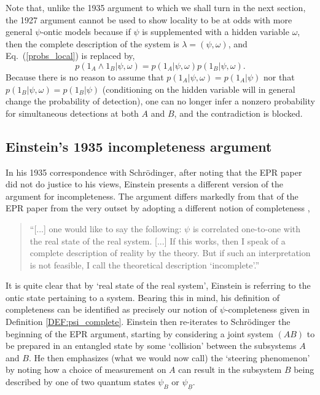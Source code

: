 \documentclass[aps,nofootinbib,12pt]{revtex4}
\begin{document}
Note that, unlike the 1935 argument to which we shall turn in the
next section, the 1927 argument cannot be used to show locality to
be at odds with more general $\psi$-ontic models because if $\psi$
is supplemented with a hidden variable $\omega$, then the complete
description of the system is $\lambda=(\psi,\omega)$, and
Eq.~(\ref{probs_local}) is replaced by,
\begin{equation}
p(1_{A}\wedge{1}_{B}|\psi,\omega)=p(1_{A}|\psi,\omega)p(1_{B}|\psi,\omega).
\end{equation}
Because there is no reason to assume that
$p(1_{A}|\psi,\omega)=p(1_{A}|\psi)$ nor that
$p(1_{B}|\psi,\omega)=p(1_{B}|\psi)$ (conditioning on the hidden
variable will in general change the probability of detection), one
can no longer infer a nonzero probability for simultaneous
detections at both $A$ and $B$, and the contradiction is blocked.

\subsection{Einstein's 1935 incompleteness argument\label{SEC:historical_1935}}

In his 1935 correspondence with Schr\"{o}dinger, after noting that
the EPR paper did not do justice to his views, Einstein presents a
different version of the argument for incompleteness. The argument
differs markedly from that of the EPR paper from the very outset by
adopting a different notion of completeness \cite{EtoS1935},

\begin{quote}
``[...] one would like to say the following: $\psi$ is correlated
one-to-one with the real state of the real system. [...] If this
works, then I speak of a complete description of reality by the
theory. But if such an interpretation is not feasible, I call the
theoretical description `incomplete'.''
\end{quote}

It is quite clear that by `real state of the real system', Einstein
is referring to the ontic state pertaining to a system. Bearing this
in mind, his definition of completeness can be identified as
precisely our notion of $\psi $-completeness given in Definition
\ref{DEF:psi_complete}. Einstein then re-iterates to Schr\"{o}dinger
the beginning of the EPR argument, starting by considering a joint
system $(AB)$ to be prepared in an entangled state by some
`collision' between the subsystems $A$ and $B$. He then emphasizes
(what we would now call) the `steering phenomenon' by noting how a
choice of measurement on $A$ can result in the subsystem $B$ being
described by one of two quantum states $\psi_B$ or
$\psi_{\underline{B}}$.
\end{document}
